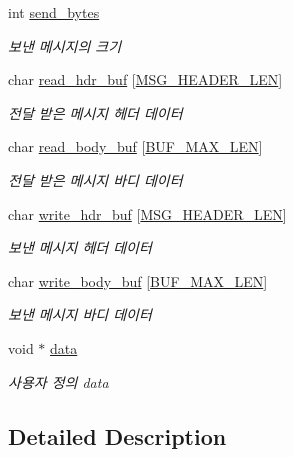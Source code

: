\begin{DoxyCompactItemize}
int \hyperlink{structtransc__s_a45be42e8e0a387c3cbda8b56cf6b57c7}{send\-\_\-bytes}
\begin{DoxyCompactList}\small\item\em 보낸 메시지의 크기 \end{DoxyCompactList}\item 
char \hyperlink{structtransc__s_adca0080bd3aef13f613a1a6e22ea39f2}{read\-\_\-hdr\-\_\-buf} \mbox{[}\hyperlink{server_8h_ae11a23d265d9943157c6d8605cc3ae81}{M\-S\-G\-\_\-\-H\-E\-A\-D\-E\-R\-\_\-\-L\-E\-N}\mbox{]}
\begin{DoxyCompactList}\small\item\em 전달 받은 메시지 헤더 데이터 \end{DoxyCompactList}\item 
char \hyperlink{structtransc__s_aaca1c744c081704ab3b0294a7755cdaf}{read\-\_\-body\-\_\-buf} \mbox{[}\hyperlink{client_8h_aae114cdd7784a59af222f175dac6312b}{B\-U\-F\-\_\-\-M\-A\-X\-\_\-\-L\-E\-N}\mbox{]}
\begin{DoxyCompactList}\small\item\em 전달 받은 메시지 바디 데이터 \end{DoxyCompactList}\item 
char \hyperlink{structtransc__s_aa3ecd0837d30a152889f2583d176bdc9}{write\-\_\-hdr\-\_\-buf} \mbox{[}\hyperlink{server_8h_ae11a23d265d9943157c6d8605cc3ae81}{M\-S\-G\-\_\-\-H\-E\-A\-D\-E\-R\-\_\-\-L\-E\-N}\mbox{]}
\begin{DoxyCompactList}\small\item\em 보낸 메시지 헤더 데이터 \end{DoxyCompactList}\item 
char \hyperlink{structtransc__s_a2dc989617bf243d4314c43439046fb0a}{write\-\_\-body\-\_\-buf} \mbox{[}\hyperlink{client_8h_aae114cdd7784a59af222f175dac6312b}{B\-U\-F\-\_\-\-M\-A\-X\-\_\-\-L\-E\-N}\mbox{]}
\begin{DoxyCompactList}\small\item\em 보낸 메시지 바디 데이터 \end{DoxyCompactList}\item 
void $\ast$ \hyperlink{structtransc__s_a7bef20277f46c5060534d45c0197e2c2}{data}
\begin{DoxyCompactList}\small\item\em 사용자 정의 data \end{DoxyCompactList}\end{DoxyCompactItemize}


\subsection{Detailed Description}



